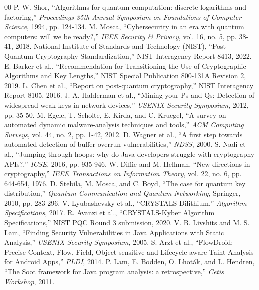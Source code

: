 \documentclass[conference]{IEEEtran}
\begin{document}
\begin{thebibliography}{00}
 P. W. Shor, ``Algorithms for quantum computation: discrete logarithms and factoring,'' \emph{Proceedings 35th Annual Symposium on Foundations of Computer Science}, 1994, pp. 124-134.
 M. Mosca, ``Cybersecurity in an era with quantum computers: will we be ready?,'' \emph{IEEE Security \& Privacy}, vol. 16, no. 5, pp. 38-41, 2018.
 National Institute of Standards and Technology (NIST), ``Post-Quantum Cryptography Standardization,'' NIST Interagency Report 8413, 2022.
 E. Barker et al., ``Recommendation for Transitioning the Use of Cryptographic Algorithms and Key Lengths,'' NIST Special Publication 800-131A Revision 2, 2019.
 L. Chen et al., ``Report on post-quantum cryptography,'' NIST Interagency Report 8105, 2016.
 J. A. Halderman et al., ``Mining your Ps and Qs: Detection of widespread weak keys in network devices,'' \emph{USENIX Security Symposium}, 2012, pp. 35-50.
 M. Egele, T. Scholte, E. Kirda, and C. Kruegel, ``A survey on automated dynamic malware-analysis techniques and tools,'' \emph{ACM Computing Surveys}, vol. 44, no. 2, pp. 1-42, 2012.
 D. Wagner et al., ``A first step towards automated detection of buffer overrun vulnerabilities,'' \emph{NDSS}, 2000.
 S. Nadi et al., ``Jumping through hoops: why do Java developers struggle with cryptography APIs?,'' \emph{ICSE}, 2016, pp. 935-946.
 W. Diffie and M. Hellman, ``New directions in cryptography,'' \emph{IEEE Transactions on Information Theory}, vol. 22, no. 6, pp. 644-654, 1976.
 D. Stebila, M. Mosca, and C. Boyd, ``The case for quantum key distribution,'' \emph{Quantum Communication and Quantum Networking}, Springer, 2010, pp. 283-296.
 V. Lyubashevsky et al., ``CRYSTALS-Dilithium,'' \emph{Algorithm Specifications}, 2017.
 R. Avanzi et al., ``CRYSTALS-Kyber Algorithm Specifications,'' NIST PQC Round 3 submission, 2020.
 V. B. Livshits and M. S. Lam, ``Finding Security Vulnerabilities in Java Applications with Static Analysis,'' \emph{USENIX Security Symposium}, 2005.
 S. Arzt et al., ``FlowDroid: Precise Context, Flow, Field, Object-sensitive and Lifecycle-aware Taint Analysis for Android Apps,'' \emph{PLDI}, 2014.
 P. Lam, E. Bodden, O. Lhoták, and L. Hendren, ``The Soot framework for Java program analysis: a retrospective,'' \emph{Cetis Workshop}, 2011.

\end{thebibliography}
\end{document}

